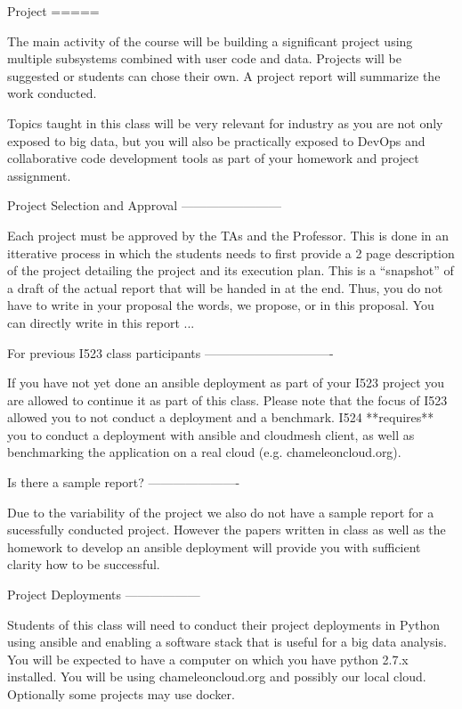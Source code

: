 Project
=====

The main activity of the course will be building a significant project
using multiple subsystems combined with user code and data. Projects
will be suggested or students can chose their own. A project report
will summarize the work conducted.

Topics taught in this class will be very relevant for industry as you
are not only exposed to big data, but you will also be practically
exposed to DevOps and collaborative code development tools as part of
your homework and project assignment.

Project Selection and Approval
------------------------

Each project must be approved by the TAs and the Professor. This is
done in an itterative process in which the students needs to first
provide a 2 page description of the project detailing the project and
its execution plan. This is a ``snapshot'' of a draft of the actual
report that will be handed in at the end. Thus, you do not have to
write in your proposal the words, we propose, or in this proposal. You
can directly write in this report ...


For previous I523 class participants
-------------------------------

If you have not yet done an ansible deployment as part of your I523
project you are allowed to continue it as part of this class. Please
note that the focus of I523 allowed you to not conduct a deployment
and a benchmark. I524 **requires** you to conduct a deployment with
ansible and cloudmesh client, as well as benchmarking the application
on a real cloud (e.g. chameleoncloud.org).

Is there a sample report?
----------------------

Due to the variability of the project we also do not have a sample
report for a sucessfully conducted project. However the papers written
in class as well as the homework to develop an ansible deployment will
provide you with sufficient clarity how to be successful.


Project Deployments
------------------
   
Students of this class will need to conduct their project deployments
in Python using ansible and enabling a software stack that is useful
for a big data analysis. You will be expected to have a computer on
which you have python 2.7.x installed. You will be using
chameleoncloud.org and possibly our local cloud. Optionally some
projects may use docker.


